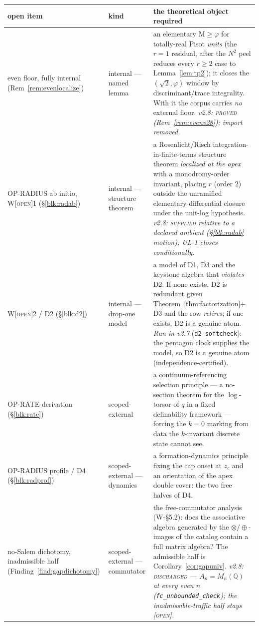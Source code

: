 \documentclass[11pt]{article}
\newcommand{\tagO}{\textcolor{cO}{\textsc{[open]}}}
\newcommand{\Q}{\mathbb{Q}}
\newcommand{\gp}{\varphi}
\newcommand{\M}{\mathrm{M}}
\theoremstyle{plain}
\theoremstyle{definition}
\theoremstyle{remark}
\begin{document}
\begin{center}\footnotesize\setlength{\tabcolsep}{4pt}
\begin{tabular}{@{}p{3.5cm}p{1.9cm}p{8.3cm}@{}}
\toprule
open item & kind & the theoretical object required\\
\midrule
even floor, fully internal (Rem~\ref{rem:evenlocalize}) & internal --- named lemma & an elementary $\M\ge\gp$ for totally-real Pisot \emph{units} (the $r=1$ residual, after the $N^2$ peel reduces every $r\ge2$ case to Lemma~\ref{lem:tp2}); it closes the $(\sqrt2,\gp)$ window by discriminant/trace integrality. With it the corpus carries \emph{no} external floor. \emph{v2.8: \textsc{proved} (Rem~\ref{rem:evenv28}); import removed.}\\[2pt]
OP-RADIUS ab initio, W\tagO{}1 (\S\ref{blk:radab}) & internal --- structure theorem & a Rosenlicht/Risch integration-in-finite-terms structure theorem \emph{localized at the apex} with a monodromy-order invariant, placing $r$ (order $2$) outside the unramified elementary-differential closure under the unit-log hypothesis. \emph{v2.8: \textsc{supplied} relative to a declared ambient (\S\ref{blk:radab} motion); UL-1 closes conditionally.}\\[2pt]
W\tagO{}2 / D2 (\S\ref{blk:d2}) & internal --- drop-one model & a model of D1, D3 and the keystone algebra that \emph{violates} D2. If none exists, D2 is redundant given Theorem~\ref{thm:factorization}$+$D3 and the row \emph{retires}; if one exists, D2 is a genuine atom. \emph{Run in v2.7} (\texttt{d2\_softcheck}): the pentagon clock supplies the model, so D2 is a genuine atom (independence-certified).\\[2pt]
OP-RATE derivation (\S\ref{blk:rate}) & scoped-external & a continuum-referencing selection principle --- a no-section theorem for the $\log$-torsor of $q$ in a fixed definability framework --- forcing the $k=0$ marking from data the $k$-invariant discrete state cannot see.\\[2pt]
OP-RADIUS profile / D4 (\S\ref{blk:radprof}) & scoped-external --- dynamics & a formation-dynamics principle fixing the cap onset at $z_c$ and an orientation of the apex double cover: the two free halves of D4.\\[2pt]
no-Salem dichotomy, inadmissible half (Finding~\ref{find:gapdichotomy}) & scoped-external --- commutator & the free-commutator analysis (W-\S5.2): does the associative algebra generated by the $\otimes/\oplus$-images of the catalog contain a full matrix algebra? The admissible half is Corollary~\ref{cor:gapuniv}. \emph{v2.8: \textsc{discharged} --- $A_n=M_n(\Q)$ at every even $n$ (\texttt{fc\_unbounded\_check}); the inadmissible-traffic half stays \tagO{}.}\\[2pt]

\end{tabular}
\end{center}
\end{document}
